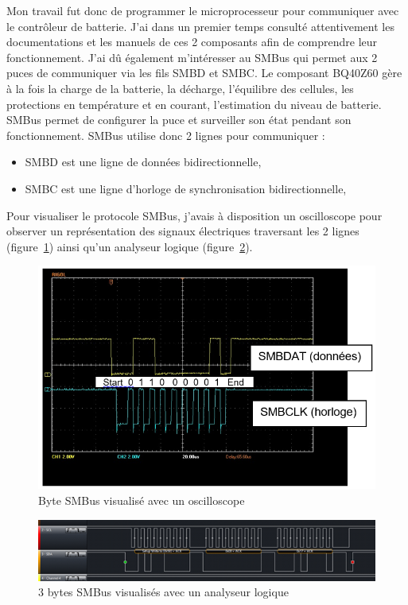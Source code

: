\documentclass[a4paper, 12pt]{report}
\begin{document}
Mon travail fut donc de programmer le microprocesseur pour communiquer avec le contrôleur de batterie. J’ai dans un premier temps consulté attentivement les documentations et les manuels de ces 2 composants afin de comprendre leur fonctionnement. J’ai dû également m’intéresser au SMBus 
qui permet aux 2 puces de communiquer via les fils SMBD et SMBC.
Le composant BQ40Z60 gère à la fois la charge de la batterie, la décharge, l’équilibre des cellules, les protections en température et en courant, l’estimation du niveau de batterie. SMBus permet de configurer la puce et surveiller son état pendant son fonctionnement.
SMBus utilise donc 2 lignes pour communiquer :
\begin{itemize} %
\item SMBD est une ligne de données bidirectionnelle,
\item SMBC est une ligne d'horloge de synchronisation bidirectionnelle,
\end{itemize}

Pour visualiser le protocole SMBus, j’avais à disposition un oscilloscope pour observer un représentation des signaux électriques traversant les 2 lignes (figure~\ref{fig:SMBus_oscilloscope}) ainsi qu’un analyseur logique (figure~\ref{fig:SMBus_logic_analyser}).

\begin{figure}[H]
\centering
\includegraphics[scale=0.6]{figures/screenshots/SMBus_oscilloscope.png}
\caption{Byte SMBus visualisé avec un oscilloscope}
\label{fig:SMBus_oscilloscope}
\end{figure}

\begin{figure}[H]
\centering
\includegraphics[scale=0.9]{figures/screenshots/SMBus_logic_analyser.png}
\caption{3 bytes SMBus visualisés avec un analyseur logique}
\label{fig:SMBus_logic_analyser}
\end{figure}
\end{document}
